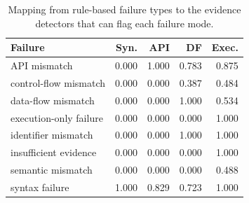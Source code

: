 \begin{table}[!htbp]
\centering
\scriptsize
\begin{tabular}{lrrrr}
\toprule
Failure & Syn. & API & DF & Exec. \\
\midrule
API mismatch & 0.000 & 1.000 & 0.783 & 0.875 \\
control-flow mismatch & 0.000 & 0.000 & 0.387 & 0.484 \\
data-flow mismatch & 0.000 & 0.000 & 1.000 & 0.534 \\
execution-only failure & 0.000 & 0.000 & 0.000 & 1.000 \\
identifier mismatch & 0.000 & 0.000 & 1.000 & 1.000 \\
insufficient evidence & 0.000 & 0.000 & 0.000 & 1.000 \\
semantic mismatch & 0.000 & 0.000 & 0.000 & 0.488 \\
syntax failure & 1.000 & 0.829 & 0.723 & 1.000 \\
\bottomrule
\end{tabular}
\vspace{0.5em}
\caption{Mapping from rule-based failure types to the evidence detectors that can flag each failure mode.}
\label{tab:failure-detection}
\end{table}

